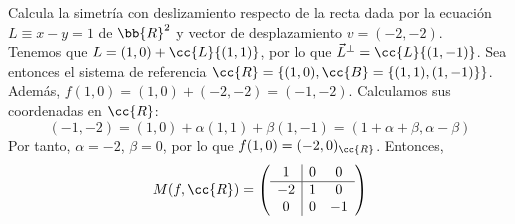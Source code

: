 \begin{ejercicio}
    Calcula la simetría con deslizamiento respecto de la recta dada por la ecuación $L\equiv x - y = 1$ de $\bb{R}^2$ y vector de desplazamiento $v = (-2, -2)$.\\

    Tenemos que $L=(1,0)+\cc{L}\{(1,1)\}$, por lo que $\vec{L}^\perp = \cc{L}\{(1,-1)\}$. Sea entonces el sistema de referencia $\cc{R}=\{(1,0), \cc{B}=\{(1,1), (1,-1)\}\}$.
    Además, $f(1,0) = (1,0) + (-2, -2) = (-1, -2)$. Calculamos sus coordenadas en $\cc{R}$:
    \begin{equation*}
        (-1, -2) = (1, 0) + \alpha (1,1) + \beta(1, -1) = (1+\alpha + \beta, \alpha-\beta)
    \end{equation*}
    Por tanto, $\alpha=-2$, $\beta=0$, por lo que $f(1,0) = (-2, 0)_{\cc{R}}$. Entonces,
    \begin{equation*}
        M(f, \cc{R}) =
        \left(\begin{array}{c|cc}
            1 & 0 & 0 \\ \hline
            -2 & 1 & 0 \\
            0 & 0 & -1
        \end{array}\right)
    \end{equation*}



\end{ejercicio}
